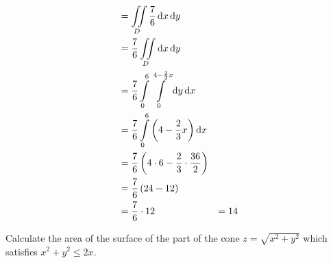 \documentclass[fleqn, a4paper, 12pt, twoside]{article}
\theoremstyle{definition}
\theoremstyle{theorem}
\begin{document}
\begin{solution}
\begin{align*}
                  & = \iint\limits_{D} \frac{7}{6} \dif x \dif y                                        \\
                  & = \frac{7}{6} \iint\limits_{D} \dif x \dif y                                        \\
                  & = \frac{7}{6} \int\limits_{0}^{6} \int\limits_{0}^{4 - \frac{2}{3} x} \dif y \dif x \\
                  & = \frac{7}{6} \int\limits_{0}^{6} \left( 4 - \frac{2}{3} x \right) \dif x           \\
                  & = \frac{7}{6} \left( 4 \cdot 6 - \frac{2}{3} \cdot \frac{36}{2} \right)             \\
                  & = \frac{7}{6} \left( 24 - 12 \right)                                                \\
                  & = \frac{7}{6} \cdot 12
                  & = 14
	\end{align*}
\end{solution}

\begin{question}
	Calculate the area of the surface of the part of the cone $z = \sqrt{x^2 + y^2}$ which satisfies $x^2 + y^2 \le 2 x$.
\end{question}
\end{document}
